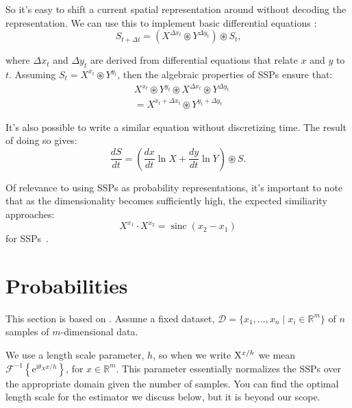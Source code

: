 \documentclass[10pt,letterpaper,oneside]{article}
\newcommand{\sinc}[1]{\operatorname{sinc}\left({#1}\right)}
\newcommand{\ssp}[1]{\mathrm{\uppercase{#1}}^{\lowercase{#1}/h}}
\begin{document}
So it's easy to shift a current spatial representation around without decoding the representation. We can use this to implement basic differential equations \cite{voelker2021a}:
\begin{equation} \label{eq:discrete-binding}
  S_{t + \Delta t} = \left ( X^{\Delta x_t} \circledast Y^{\Delta y_t} \right ) \circledast S_{t}  \text{,}
\end{equation}

where $\Delta x_t$ and $\Delta y_t$ are derived from differential equations that relate $x$ and $y$ to $t$. Assuming $ S_{t}=X^{x_t} \circledast Y^{y_t}$, then the algebraic properties of SSPs ensure that: 
\begin{align}
  & X^{x_t} \circledast Y^{y_t} \circledast X^{\Delta x_t} \circledast Y^{\Delta y_t} \\
  &= X^{x_t + \Delta x_t} \circledast Y^{y_t + \Delta y_t} 
\end{align}

It's also possible to write a similar equation without discretizing time. The result of doing so gives: 
\begin{equation} \label{eq:continuous-binding}
  \frac{d S }{dt} = \left( \frac{dx}{dt} \ln X + \frac{dy}{dt} \ln Y \right) \circledast S \text{.}
 \end{equation}

Of relevance to using SSPs as probability representations, it's important to note that as the dimensionality becomes sufficiently high, the expected similiarity approaches:
\begin{equation}
X^{x_1} \cdot X^{x_2} = \sinc{x_2 - x_1}
\end{equation}
for SSPs~\cite{voelker2020short}.




\section{Probabilities}

This section is based on \cite{furlong2022fractional}. Assume a fixed dataset, $\mathcal{D} = \{x_{1},\ldots,x_{n}\mid x_{i} \in \mathbb{R}^{m}\}$ of $n$ samples of $m$-dimensional data. 

We use a length scale parameter, $h$, so when we write $\ssp{x}$ we mean $\mathcal{F}^{-1}\left\{\mathrm{e}^{\mathrm{i}\theta_{X}x/h}\right\}$, for $x \in \mathbb{R}^{m}$. This parameter essentially normalizes the SSPs over the appropriate domain given the number of samples. You can find the optimal length scale for the estimator we discuss below, but it is beyond our scope.
\end{document}
